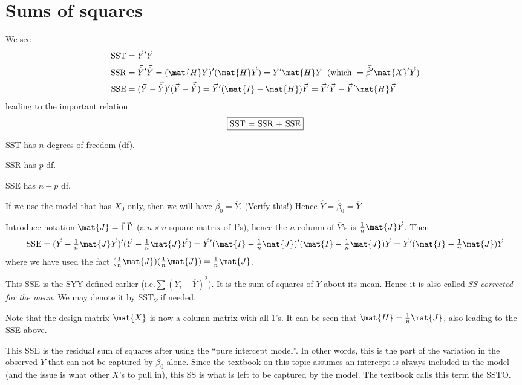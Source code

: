 \documentclass[12pt]{article}
\newcommand\nn{{\textstyle\frac{1}{n}}}
\newcommand\JJ{\nn\mat{J}}
\begin{document}
\section{Sums of squares}

We see
\[\begin{split}
\text{SST}
    & = \vec{Y}'\vec{Y}
\\
\text{SSR}
    & = \vec{\hat{Y}}'\vec{\hat{Y}}
      = (\mat{H}\vec{Y})' (\mat{H}\vec{Y})
      = \vec{Y}'\mat{H}\vec{Y}
      \;\; (\text{which }= \vec{\hat{\beta}}'\mat{X}'\vec{Y})
\\
\text{SSE}
    & = (\vec{Y} - \vec{\hat{Y}})' (\vec{Y} - \vec{\hat{Y}})
      = \vec{Y}' (\mat{I} - \mat{H}) \vec{Y}
      = \vec{Y}'\vec{Y} - \vec{Y}'\mat{H}\vec{Y}
\end{split}
\]
leading to the important relation
\[
\fbox{\text{SST} = \text{SSR} + \text{SSE}}
\]

SST has $n$ degrees of freedom (df).

SSR has $p$ df.

SSE has $n-p$ df.


\example
If we use the model that has $X_0$ only, then we will have
$\hat\beta_0 = \overline{Y}$.
(Verify this!)
Hence $\hat{Y} = \hat\beta_0 = \overline{Y}$.

Introduce notation
$\mat{J} = \vec{1}\,\vec{1}'$
(a $n\times n$ square matrix of 1's),
hence the $n$-column of $\overline{Y}$'s is
$\JJ\vec{Y}$.
Then
\[
\text{SSE}
= (\vec{Y}- \JJ\vec{Y})' (\vec{Y} - \JJ\vec{Y})
= \vec{Y}' (\mat{I} - \JJ)'(\mat{I} - \JJ)\vec{Y}
= \vec{Y}' (\mat{I} - \JJ) \vec{Y}
\]
where we have used the fact
$(\JJ)(\JJ) = \JJ$.

This SSE is the SYY defined earlier
(i.e.\@ $\sum (Y_i - \overline{Y})^2$).
It is the sum of squares of $Y$ about its mean.
Hence it is also called
\emph{SS corrected for the mean}.
We may denote it by
$\text{SST}_{\overline{Y}}$ if needed.

Note that the design matrix $\mat{X}$ is now
a column matrix with all 1's.
It can be seen that $\mat{H} = \JJ$,
also leading to the SSE above.

This SSE is the residual sum of squares
after using the ``pure intercept model''.
In other words,
this is the part of the variation in
the observed $Y$ that can not be captured
by $\beta_0$ alone.
Since the textbook on this topic
assumes an intercept is always included in the model
(and the issue is what other $X$'s to pull in),
this SS is what is left to be captured by the model.
The textbook calls this term the SSTO.
\end{document}
